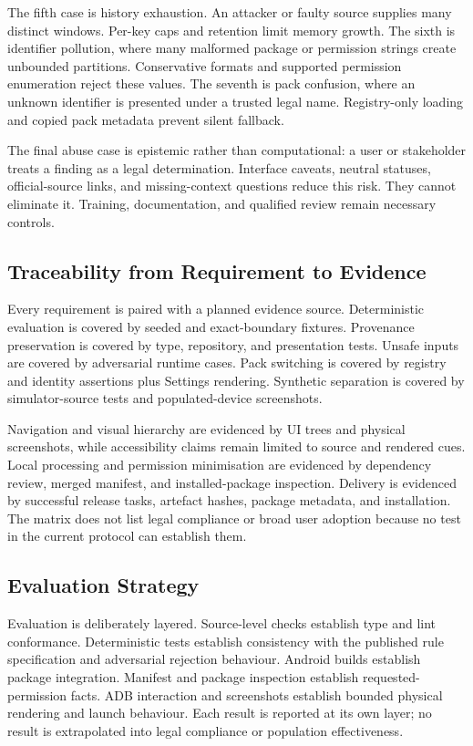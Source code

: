 The fifth case is history exhaustion. An attacker or faulty source supplies many distinct windows. Per-key caps and retention limit memory growth. The sixth is identifier pollution, where many malformed package or permission strings create unbounded partitions. Conservative formats and supported permission enumeration reject these values. The seventh is pack confusion, where an unknown identifier is presented under a trusted legal name. Registry-only loading and copied pack metadata prevent silent fallback.

The final abuse case is epistemic rather than computational: a user or stakeholder treats a finding as a legal determination. Interface caveats, neutral statuses, official-source links, and missing-context questions reduce this risk. They cannot eliminate it. Training, documentation, and qualified review remain necessary controls.

\subsection{Traceability from Requirement to Evidence}

Every requirement is paired with a planned evidence source. Deterministic evaluation is covered by seeded and exact-boundary fixtures. Provenance preservation is covered by type, repository, and presentation tests. Unsafe inputs are covered by adversarial runtime cases. Pack switching is covered by registry and identity assertions plus Settings rendering. Synthetic separation is covered by simulator-source tests and populated-device screenshots.

Navigation and visual hierarchy are evidenced by UI trees and physical screenshots, while accessibility claims remain limited to source and rendered cues. Local processing and permission minimisation are evidenced by dependency review, merged manifest, and installed-package inspection. Delivery is evidenced by successful release tasks, artefact hashes, package metadata, and installation. The matrix does not list legal compliance or broad user adoption because no test in the current protocol can establish them.

\subsection{Evaluation Strategy}

Evaluation is deliberately layered. Source-level checks establish type and lint conformance. Deterministic tests establish consistency with the published rule specification and adversarial rejection behaviour. Android builds establish package integration. Manifest and package inspection establish requested-permission facts. ADB interaction and screenshots establish bounded physical rendering and launch behaviour. Each result is reported at its own layer; no result is extrapolated into legal compliance or population effectiveness.

